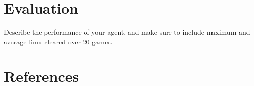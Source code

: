 \documentclass[12pt,letterpaper]{article}
\begin{document}
\section{Evaluation}
Describe the performance of your agent, and make sure to include maximum and average lines cleared over 20 games.

\section{References}
\end{document}
